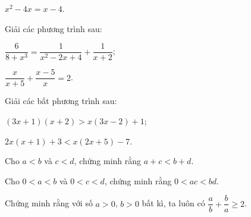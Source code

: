 \begin{practice}
\begin{questions}[resume=SBT]
\begin{questions}
            \answerline
            \answerline

            \item $x^2-4x=x-4$.

            \answerline
            \answerline
        \end{questions}

        \item Giải các phương trình sau:
        \begin{questions}
            \item $\dfrac{6}{8+x^3}=\dfrac{1}{x^2-2x+4}+\dfrac{1}{x+2}$;

            \answerline
            \answerline
            \answerline

            \item $\dfrac{x}{x+5}+\dfrac{x-5}{x}=2$.

            \answerline
            \answerline
            \answerline
        \end{questions}

        \item Giải các bất phương trình sau:
        \begin{questions}
            \item $(3x+1)(x+2)>x(3x-2)+1$;

            \answerline
            \answerline

            \item $2x(x+1)+3<x(2x+5)-7$.

            \answerline
            \answerline
        \end{questions}

        \item
        \begin{questions}
            \item Cho $a<b$ và $c<d$, chứng minh rằng $a+c<b+d$.

            \answerline
            \answerline
            \answerline

            \item Cho $0<a<b$ và $0<c<d$, chứng minh rằng $0<ac<bd$.

            \answerline
            \answerline
            \answerline
        \end{questions}

        \item Chứng minh rằng với số $a>0$, $b>0$ bất kì, ta luôn có $\dfrac{a}{b}+\dfrac{b}{a}\geq2$.


\end{questions}
\end{practice}
